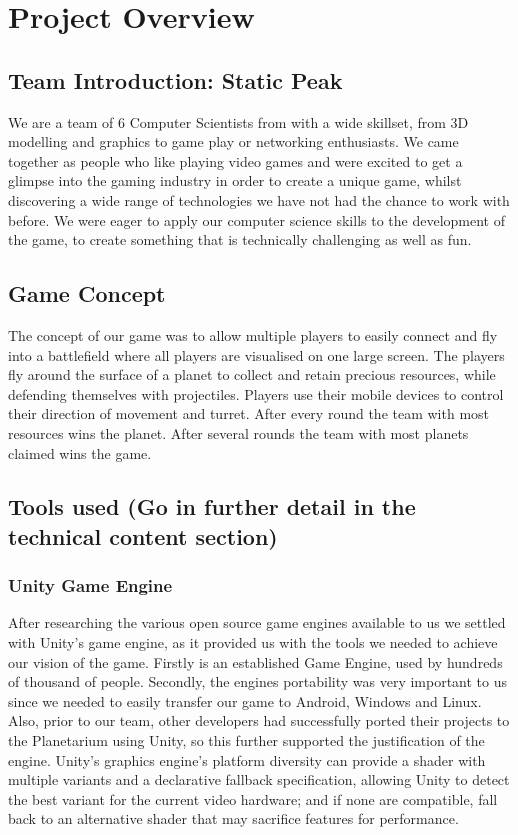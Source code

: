\documentclass[11pt,a4paper]{article}
\begin{document}
\section{Project Overview}

\subsection{Team Introduction: Static Peak} 
 We are a team of 6 Computer Scientists from with a wide skillset, from 3D modelling and graphics to game play or networking enthusiasts. We came together as people who like playing video games and were excited to get a glimpse into the gaming industry in order to create a unique game, whilst discovering a wide range of technologies we have not had the chance to work with before. We were eager to apply our computer science skills to the development of the game, to create something that is technically challenging as well as fun.

 \subsection{Game Concept}
  The concept of our game was to allow multiple players to easily connect and fly into a battlefield where all players are visualised on one large screen. The players fly around the surface of a planet to collect and retain precious resources, while defending themselves with projectiles. Players use their mobile devices to control their direction of movement and turret. After every round the team with most resources wins the planet. After several rounds the team with most planets claimed wins the game.

 \subsection{ Tools used (Go in further detail in the technical content section)}

 \subsubsection{  Unity Game Engine}

 After researching the various open source game engines available to us we settled with Unity’s game engine, as it provided us with the tools we needed to achieve our vision of the game. Firstly is an established Game Engine, used by hundreds of thousand of people. Secondly, the engines portability was very important to us since we needed to easily transfer our game to Android, Windows and Linux. Also, prior to our team, other developers had successfully ported their projects to the Planetarium using Unity, so this further supported the justification of the engine. Unity's graphics engine's platform diversity can provide a shader with multiple variants and a declarative fallback specification, allowing Unity to detect the best variant for the current video hardware; and if none are compatible, fall back to an alternative shader that may sacrifice features for performance.
\end{document}
